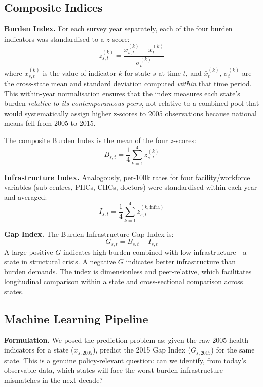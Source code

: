 \documentclass[conference]{IEEEtran}
\begin{document}
\subsection{Composite Indices}

\textbf{Burden Index.} For each survey year separately, each of the
four burden indicators was standardised to a $z$-score:
\begin{equation}
z_{s,t}^{(k)} = \frac{x_{s,t}^{(k)} - \bar{x}_t^{(k)}}{\sigma_t^{(k)}}
\end{equation}
where $x_{s,t}^{(k)}$ is the value of indicator $k$ for state $s$
at time $t$, and $\bar{x}_t^{(k)}$, $\sigma_t^{(k)}$ are the
cross-state mean and standard deviation computed \emph{within} that
time period. This within-year normalisation ensures that the index
measures each state's burden \emph{relative to its contemporaneous
peers}, not relative to a combined pool that would systematically
assign higher z-scores to 2005 observations because national means
fell from 2005 to 2015.

The composite Burden Index is the mean of the four $z$-scores:
\begin{equation}
B_{s,t} = \frac{1}{4}\sum_{k=1}^{4} z_{s,t}^{(k)}
\end{equation}

\textbf{Infrastructure Index.} Analogously, per-100k rates for four
facility/workforce variables (sub-centres, PHCs, CHCs, doctors) were
standardised within each year and averaged:
\begin{equation}
I_{s,t} = \frac{1}{4}\sum_{k=1}^{4} z_{s,t}^{(k,\text{infra})}
\end{equation}

\textbf{Gap Index.} The Burden-Infrastructure Gap Index is:
\begin{equation}
G_{s,t} = B_{s,t} - I_{s,t}
\end{equation}
A large positive $G$ indicates high burden combined with low
infrastructure---a state in structural crisis. A negative $G$
indicates better infrastructure than burden demands. The index
is dimensionless and peer-relative, which facilitates longitudinal
comparison within a state and cross-sectional comparison across states.

\subsection{Machine Learning Pipeline}

\textbf{Formulation.} We posed the prediction problem as: given the
raw 2005 health indicators for a state ($x_{s,2005}$), predict the
2015 Gap Index ($G_{s,2015}$) for the same state. This is
a genuine policy-relevant question: can we identify, from today's
observable data, which states will face the worst burden-infrastructure
mismatches in the next decade?
\end{document}
